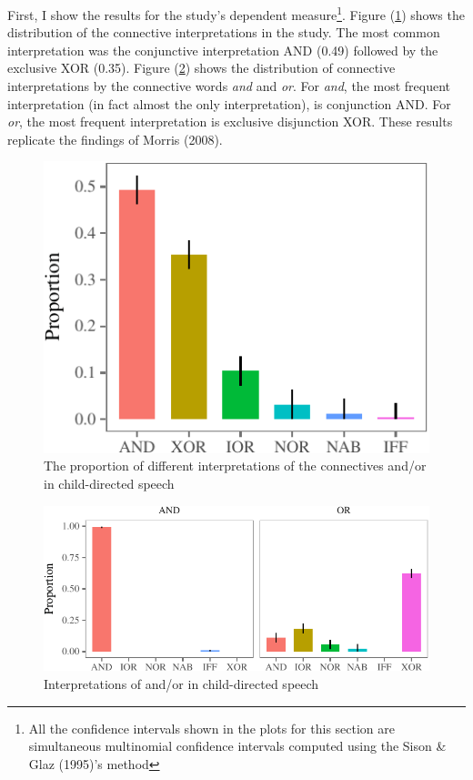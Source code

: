 \documentclass[oneside]{report}
\theoremstyle{definition}
\theoremstyle{definition}
\theoremstyle{definition}
\theoremstyle{remark}
\begin{document}
First, I show the results for the study's dependent measure\footnote{All
  the confidence intervals shown in the plots for this section are
  simultaneous multinomial confidence intervals computed using the Sison
  \& Glaz (1995)'s method}. Figure (\ref{fig:interpretationPlot}) shows
the distribution of the connective interpretations in the study. The
most common interpretation was the conjunctive interpretation AND (0.49)
followed by the exclusive XOR (0.35). Figure (\ref{fig:connectivePlot})
shows the distribution of connective interpretations by the connective
words \emph{and} and \emph{or}. For \emph{and}, the most frequent
interpretation (in fact almost the only interpretation), is conjunction
AND. For \emph{or}, the most frequent interpretation is exclusive
disjunction XOR. These results replicate the findings of Morris (2008).
\begin{figure}[tb]

{\centering \includegraphics{figs/interpretationPlot-1} 

}

\caption{The proportion of different interpretations of the connectives and/or in child-directed speech}\label{fig:interpretationPlot}
\end{figure}
\begin{figure}[tb]

{\centering \includegraphics{figs/connectivePlot-1} 

}

\caption{Interpretations of and/or in child-directed speech}\label{fig:connectivePlot}
\end{figure}
\end{document}
